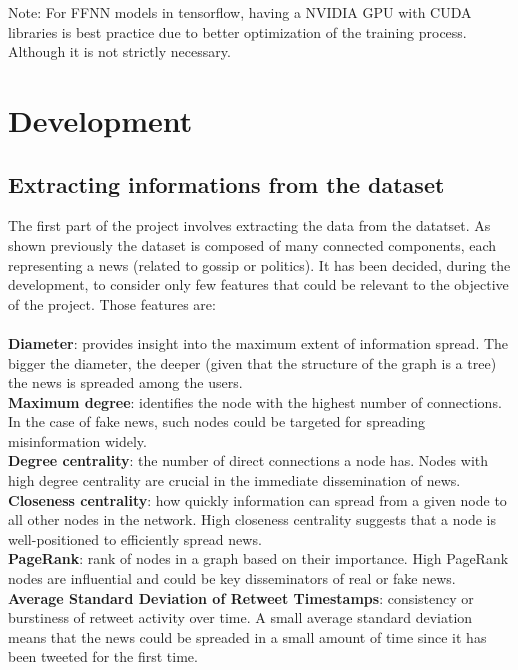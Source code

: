 \documentclass[11pt,a4paper]{article}
\begin{document}
Note: For FFNN models in tensorflow, having a NVIDIA GPU with CUDA libraries is best practice due to better optimization of the training process. Although it is not strictly necessary.

\section*{Development}

\subsection*{Extracting informations from the dataset}

The first part of the project involves extracting the data from the datatset. As shown previously the dataset is composed of many connected components, each representing a news (related to gossip or politics). It has been decided, during the development, to consider only few features that could be relevant to the objective of the project.
Those features are:\\\\
\textbf{Diameter}: provides insight into the maximum extent of information spread. The bigger the diameter, the deeper (given that the structure of the graph is a tree) the news is spreaded among the users.\\
\textbf{Maximum degree}: identifies the node with the highest number of connections. In the case of fake news, such nodes could be targeted for spreading misinformation widely.\\
\textbf{Degree centrality}: the number of direct connections a node has. Nodes with high degree centrality are crucial in the immediate dissemination of news.\\
\textbf{Closeness centrality}: how quickly information can spread from a given node to all other nodes in the network. High closeness centrality suggests that a node is well-positioned to efficiently spread news.\\
\textbf{PageRank}: rank of nodes in a graph based on their importance. High PageRank nodes are influential and could be key disseminators of real or fake news.\\
\textbf{Average Standard Deviation of Retweet Timestamps}: consistency or burstiness of retweet activity over time. A small average standard deviation means that the news could be spreaded in a small amount of time since it has been tweeted for the first time.\\
\end{document}
